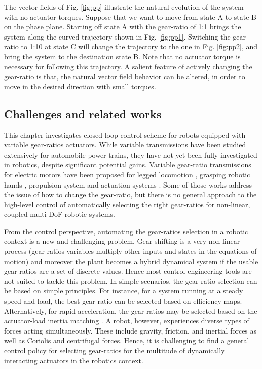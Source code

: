 The vector fields of Fig. \ref{fig:pp} illustrate the natural evolution of the system with no actuator torques. Suppose that we want to move from state A to state B on the phase plane. Starting off state A with the gear-ratio of 1:1 brings the system along the curved trajectory shown in Fig. \ref{fig:pp1}. Switching the gear-ratio to 1:10 at state C will change the trajectory to the one in Fig. \ref{fig:pp2}, and bring the system to the destination state B. Note that no actuator torque is necessary for following this trajectory. A salient feature of actively changing the gear-ratio is that, the natural vector field behavior can be altered, in order to move in the desired direction with small torques.



\subsection{Challenges and related works}
\label{sec:chal}

This chapter investigates closed-loop control scheme for robots equipped with variable gear-ratios actuators. While variable transmissions have been studied extensively for automobile power-trains, they have not yet been fully investigated in robotics, despite significant potential gains. Variable gear-ratio transmissions for electric motors have been proposed for legged locomotion \cite{hirose_design_1991}, grasping robotic hands \cite{shin_robot_2012} , propulsion system \cite{lee_new_2012} \cite{mckeegan_antonovs_2011} and actuation systems \cite{girard_two-speed_2015} \cite{hirose_development_1999} \cite{tahara_high-backdrivable_2011}. Some of those works address the issue of how to change the gear-ratio, but there is no general approach to the high-level control of automatically selecting the right gear-ratios for non-linear, coupled multi-DoF robotic systems.

From the control perspective, automating the gear-ratios selection in a robotic context is a new and challenging problem. Gear-shifting is a very non-linear process (gear-ratios variables multiply other inputs and states in the equations of motion) and moreover the plant becomes a hybrid dynamical system if the usable gear-ratios are a set of discrete values. Hence most control engineering tools are not suited to tackle this problem. In simple scenarios, the gear-ratio selection can be based on simple principles. For instance, for a system running at a steady speed and load, the best gear-ratio can be selected based on efficiency maps. Alternatively, for rapid acceleration, the gear-ratios may be selected based on the actuator-load inertia matching \cite{giberti_effects_2010} \cite{chen_generalized_1991}. A robot, however, experiences diverse types of forces acting simultaneously. These include gravity, friction, and inertial forces as well as Coriolis and centrifugal forces. Hence, it is challenging to find a general control policy for selecting gear-ratios for the multitude of dynamically interacting actuators in the robotics context. 

